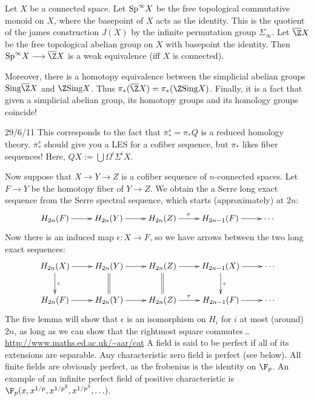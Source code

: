\documentclass[11pt]{article}
\begin{document}
\pagebreak
\begin{FirstTen}
Let $X$ be a connected space. Let $\textup{Sp}^\infty X$ be the free topological
commutative monoid on $X$, where the basepoint of $X$ acts as the identity. This
is the quotient of the james construction $J(X)$ by the infinite permutation
group $\Sigma_\infty$. Let $\overline\Z X$ be the free topological abelian group
on $X$ with basepoint the identity. Then $\textup{Sp}^\infty X\to \overline\Z X$
is a weak equivalence (iff $X$ is connected).

Moreover, there is a homotopy equivalence between the simplicial abelian groups
$\textup{Sing}\overline\Z X$ and $\Z\textup{Sing}X$. Thus $\pi_*(\overline\Z
X)=\pi_*(\Z\textup{Sing}X)$. Finally, it is a fact that given a simplicial
abelian group, its homotopy groups and its homology groups coincide!


{29/6/11}
This corresponds to the fact that $\overline\pi_*^s=\pi_*Q$ is a reduced
homology theory. $\overline\pi_*^s$ should give you a LES for a cofiber
sequence, but $\pi_*$ likes fiber sequences! Here, $QX:=\bigcup\Omega^i\Sigma^i
X$.

Now suppose that $X\to Y\to Z$ is a cofiber sequence of $n$-connected spaces.
Let $F\to Y$ be the homotopy fiber of $Y\to Z$. We obtain the a Serre long exact
sequence from the Serre spectral sequence, which starts (approximately) at $2n$:
\[\xymatrix{
H_{2n}(F)\ar[r]&H_{2n}(Y)\ar[r]&H_{2n}(Z)\ar[r]^{\tau\ \ }&
H_{2n-1}(F)\ar[r]&\cdots
}\]
Now there is an induced map $\epsilon:X\to F$, so we have arrows between the two
long exact sequences:
\[\xymatrix{
H_{2n}(X)\ar[r]\ar[d]^\epsilon&H_{2n}(Y)\ar[r]\ar@{=}[d]&
H_{2n}(Z)\ar[r]^{\ \ }\ar@{=}[d]&H_{2n-1}(X)\ar[r]\ar[d]^\epsilon&\cdots\\
H_{2n}(F)\ar[r]&H_{2n}(Y)\ar[r]&H_{2n}(Z)\ar[r]^{\tau\ \ }&
H_{2n-1}(F)\ar[r]&\cdots
}\]
The five lemma will show that $\epsilon$ is an isomorphism on $H_{i}$ for $i$ at
most (around) $2n$, as long as we can show that the rightmost square 
commutes\,\ldots
{}
\url{http://www.maths.ed.ac.uk/~aar/cat}
A field is said to be perfect if all of its extensions are separable. Any
characteristic zero field is perfect (see below). All finite fields are
obviously perfect, as the frobenius is the identity on $\F_p$. An example of an
infinite perfect field of positive characteristic is
$\F_p(x,x^{1/p},x^{1/p^2},x^{1/p^3},\ldots)$.


\end{FirstTen}
\end{document}
